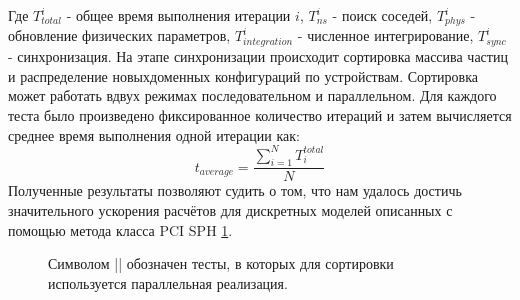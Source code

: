 Где \(T_{total}^{i}\) - общее время выполнения итерации \(i\), \(T_{ns}^{i}\) - поиск соседей, \(T_{phys}^{i}\) - обновление физических   параметров, \(T_{integration}^{i}\) - численное интегрирование, \(T_{sync}^{i}\) - синхронизация. На этапе синхронизации происходит сортировка массива частиц и распределение новыхдоменных конфигураций по устройствам. Сортировка может работать вдвух режимах  последовательном и параллельном. Для каждого теста было произведено фиксированное количество итераций и затем вычисляется среднее время выполнения одной итерации как:
\[
  t_{average} = \frac{\sum_{i=1}^{N}T_{i}^{total}}{N}
\]
Полученные результаты позволяют судить о том, что нам удалось достичь значительного ускорения расчётов для дискретных моделей описанных с помощью метода класса PCI SPH \ref{fig:result}.
\begin{figure}[ht]
  \caption{Символом || обозначен тесты, в которых для сортировки используется параллельная реализация.}\label{fig:result}
\end{figure}